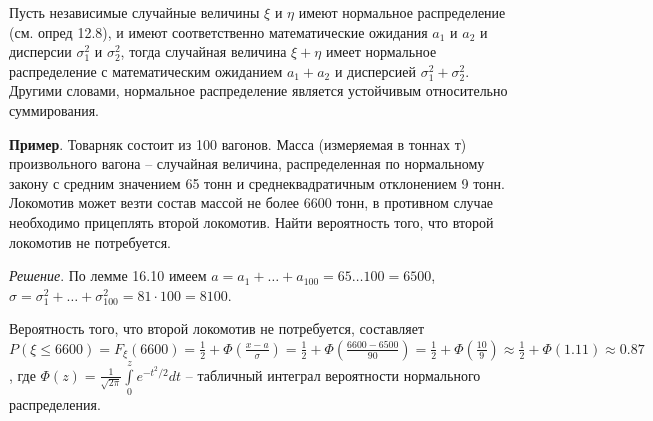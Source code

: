 \begin{lemma}
Пусть независимые случайные величины $\xi$ и $\eta$ имеют
нормальное распределение (см. опред 12.8), и имеют соответственно математические ожидания $a_1$ и $a_2$ и дисперсии $\sigma_1^2$ и $\sigma_2^2$, тогда случайная величина $\xi + \eta$ имеет нормальное распределение с математическим ожиданием $a_1 + a_2$ и дисперсией $\sigma_1^2+\sigma_2^2$. Другими словами, нормальное распределение является устойчивым относительно суммирования.	
\end{lemma}

\textbf{Пример}. Товарняк состоит из 100 вагонов. Масса (измеряемая в тоннах т) произвольного вагона -- случайная величина, распределенная по нормальному закону с средним значением 65 тонн и среднеквадратичным отклонением 9 тонн. Локомотив может везти состав массой не более 6600 тонн, в противном случае необходимо прицеплять второй локомотив. Найти вероятность того, что второй локомотив не потребуется.

\textit{Решение}. По лемме 16.10 имеем $a = a_1 + \ldots + a_100 = 65 \ldots 100 = 6500$, $\sigma = \sigma_1^2 +\ldots+\sigma_100^2=81\cdot100 = 8100$.

Вероятность того, что второй локомотив не потребуется, составляет $P(\xi \leq 6600) = F_\xi (6600)=\frac{1}{2}+\Phi(\frac{x-a}{\sigma})=\frac{1}{2}+\Phi(\frac{6600-6500}{90})=\frac{1}{2}+\Phi(\frac{10}{9})\approx\frac{1}{2}+\Phi(1.11)\approx0.87$, где $\Phi(z) = \frac{1}{\sqrt{2\pi}}\int\limits_0^z e^{-t^2/2}dt$ -- табличный интеграл вероятности нормального распределения. 